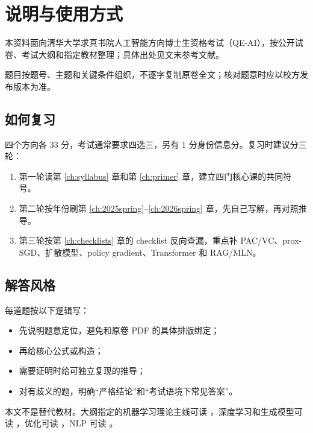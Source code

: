 \chapter{说明与使用方式}

本资料面向清华大学求真书院人工智能方向博士生资格考试（QE-AI），按公开试卷、考试大纲和指定教材整理；具体出处见文末参考文献。

题目按题号、主题和关键条件组织，不逐字复制原卷全文；核对题意时应以校方发布版本为准。

\section{如何复习}

四个方向各 33 分，考试通常要求四选三，另有 1 分身份信息分。复习时建议分三轮：

\begin{enumerate}
  \item 第一轮读第 \ref{ch:syllabus} 章和第 \ref{ch:primer} 章，建立四门核心课的共同符号。
  \item 第二轮按年份刷第 \ref{ch:2025spring}--\ref{ch:2026spring} 章，先自己写解，再对照推导。
  \item 第三轮按第 \ref{ch:checklists} 章的 checklist 反向查漏，重点补 PAC/VC、prox-SGD、扩散模型、policy gradient、Transformer 和 RAG/MLN。
\end{enumerate}

\section{解答风格}

每道题按以下逻辑写：

\begin{itemize}
  \item 先说明题意定位，避免和原卷 PDF 的具体排版绑定；
  \item 再给核心公式或构造；
  \item 需要证明时给可独立复现的推导；
  \item 对有歧义的题，明确“严格结论”和“考试语境下常见答案”。
\end{itemize}

本文不是替代教材。大纲指定的机器学习理论主线可读 \textcite{shalev2014uml,mohri2018foundations}，深度学习和生成模型可读 \textcite{goodfellow2016deep,bishop2023deep,bishop2006prml}，优化可读 \textcite{nesterov2018convex,beck2017first}，NLP 可读 \textcite{jurafsky2026slp,goldberg2017nnnlp}。
